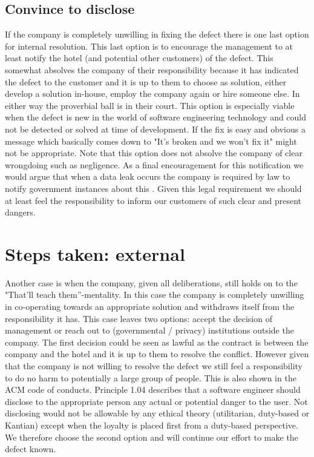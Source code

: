 \subsection*{Convince to disclose}
If the company is completely unwilling in fixing the defect there is one last option for internal resolution. This last option is to encourage the management  to at least notify the hotel (and potential other customers) of the defect. This somewhat absolves the company of their responsibility because it has indicated the defect to the customer and it is up to them to choose as solution, either develop a solution in-house, employ the company again or hire someone else. In either way the proverbial ball is in their court. This option is especially viable when the defect is new in the world of software engineering technology and could not be detected or solved at time of development. If the fix is easy and obvious a message which basically comes down to "It's broken and we won't fix it" might not be appropriate. Note that this option does not absolve the company of clear wrongdoing such as negligence. As a final encouragement for this notification we would argue that when a data leak occurs the company is required by law to notify government instances about this \cite{privacy_directive}. Given this legal requirement we should at least feel the responsibility to inform our customers of such clear and present dangers.

\section{Steps taken: external}
Another case is when the company, given all deliberations, still holds on to the "That'll teach them”-mentality. In this case the company is completely unwilling in co-operating towards an appropriate solution and withdraws itself from the responsibility it has. This case leaves two options: accept the decision of management or reach out to (governmental / privacy) institutions outside the company. The first decision could be seen as lawful as the contract is between the company and the hotel and it is up to them to resolve the conflict. However given that the company is not willing to resolve the defect we still feel a responsibility to do no harm to potentially a large group of people. This is also shown in the ACM code of conducts\cite{acm_code_of_conduct}. Principle 1.04 describes that a software engineer should disclose to the appropriate person any actual or potential danger to the user. Not disclosing would not be allowable by any ethical theory (utilitarian, duty-based or Kantian) except when the loyalty is placed first from a duty-based perspective. We therefore choose the second option and will continue our effort to make the defect known.

